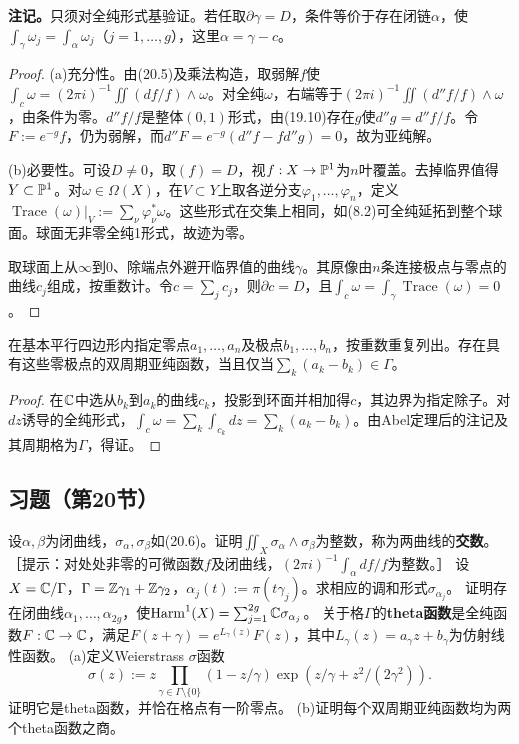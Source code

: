\textbf{注记。}只须对全纯形式基验证。若任取$\partial\gamma=D$，条件等价于存在闭链$\alpha$，使$\int_\gamma\omega_j=\int_\alpha\omega_j$（$j=1,\ldots,g$），这里$\alpha=\gamma-c$。
\begin{proof}
(a)充分性。由(20.5)及乘法构造，取弱解$f$使$\int_c\omega=(2\pi i)^{-1}\iint(df/f)\wedge\omega$。对全纯$\omega$，右端等于$(2\pi i)^{-1}\iint(d''f/f)\wedge\omega$，由条件为零。$d''f/f$是整体$(0,1)$形式，由(19.10)存在$g$使$d''g=d''f/f$。令$F:=e^{-g}f$，仍为弱解，而$d''F=e^{-g}(d''f-fd''g)=0$，故为亚纯解。

(b)必要性。可设$D\ne0$，取$(f)=D$，视$f:X\to\mathbb P^1$为$n$叶覆盖。去掉临界值得$Y\subset\mathbb P^1$。对$\omega\in\Omega(X)$，在$V\subset Y$上取各逆分支$\varphi_1,\ldots,\varphi_n$，定义$\operatorname{Trace}(\omega)|_V:=\sum_\nu\varphi_\nu^*\omega$。这些形式在交集上相同，如(8.2)可全纯延拓到整个球面。球面无非零全纯1形式，故迹为零。

取球面上从$\infty$到0、除端点外避开临界值的曲线$\gamma$。其原像由$n$条连接极点与零点的曲线$c_j$组成，按重数计。令$c=\sum_jc_j$，则$\partial c=D$，且$\int_c\omega=\int_\gamma\operatorname{Trace}(\omega)=0$。
\end{proof}
在基本平行四边形内指定零点$a_1,\ldots,a_n$及极点$b_1,\ldots,b_n$，按重数重复列出。存在具有这些零极点的双周期亚纯函数，当且仅当$\sum_k(a_k-b_k)\in\Gamma$。
\begin{proof}
在$\mathbb C$中选从$b_k$到$a_k$的曲线$c_k$，投影到环面并相加得$c$，其边界为指定除子。对$dz$诱导的全纯形式，$\int_c\omega=\sum_k\int_{c_k}dz=\sum_k(a_k-b_k)$。由Abel定理后的注记及其周期格为$\Gamma$，得证。
\end{proof}
\subsection*{习题（第20节）}
设$\alpha,\beta$为闭曲线，$\sigma_\alpha,\sigma_\beta$如(20.6)。证明$\iint_X\sigma_\alpha\wedge\sigma_\beta$为整数，称为两曲线的\textbf{交数}。［提示：对处处非零的可微函数$f$及闭曲线，$(2\pi i)^{-1}\int_\alpha df/f$为整数。］
设$X=\mathbb C/\Gamma$，$\Gamma=\mathbb Z\gamma_1+\mathbb Z\gamma_2$，$\alpha_j(t):=\pi(t\gamma_j)$。求相应的调和形式$\sigma_{\alpha_j}$。
证明存在闭曲线$\alpha_1,\ldots,\alpha_{2g}$，使$\operatorname{Harm}^1(X)=\sum_{j=1}^{2g}\mathbb C\sigma_{\alpha_j}$。
关于格$\Gamma$的\textbf{theta函数}是全纯函数$F:\mathbb C\to\mathbb C$，满足$F(z+\gamma)=e^{L_\gamma(z)}F(z)$，其中$L_\gamma(z)=a_\gamma z+b_\gamma$为仿射线性函数。
(a)定义Weierstrass $\sigma$函数
\[
\sigma(z):=z\prod_{\gamma\in\Gamma\setminus\{0\}}(1-z/\gamma)\exp(z/\gamma+z^2/(2\gamma^2)).
\]
证明它是theta函数，并恰在格点有一阶零点。
(b)证明每个双周期亚纯函数均为两个theta函数之商。
